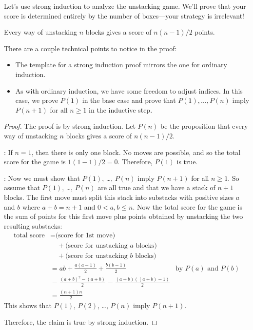 \iffalse
You will see in class how to use strong induction to analyze this game of
blocks.
\fi



Let's use strong induction to analyze the unstacking game.  We'll prove
that your score is determined entirely by the number of boxes---your
strategy is irrelevant!

\begin{theorem}\label{stacking}
Every way of unstacking $n$ blocks gives a score of $n(n-1)/2$ points.
\end{theorem}

There are a couple technical points to notice in the proof:

\begin{itemize}

\item The template for a strong induction proof mirrors the one for
  ordinary induction.

\item As with ordinary induction, we have some freedom to adjust indices.
In this case, we prove $P(1)$ in the base case and prove that $P(1),
\dots, P(n)$ imply $P(n+1)$ for all $n \geq 1$ in the inductive step.

\end{itemize}

\begin{proof}
The proof is by strong induction.  Let $P(n)$ be the proposition that
every way of unstacking $n$ blocks gives a score of $n(n-1)/2$.

: If $n = 1$, then there is only one
block.  No moves are possible, and so the total score for the game is
$1(1 - 1)/2 = 0$.  Therefore, $P(1)$ is true.

: Now we must show that $P(1)$, \dots, $P(n)$ imply
$P(n+1)$ for all $n \geq 1$.  So assume that $P(1)$, \dots, $P(n)$ are all
true and that we have a stack of $n+1$ blocks.  The first move must split
this stack into substacks with positive sizes $a$ and $b$ where $a+b =
n+1$ and $0<a,b\leq n$.  Now the total score for the game is the sum of
points for this first move plus points obtained by unstacking the two
resulting substacks:
%
\begin{align*}
\text{total score}
    & = \text{(score for 1st move)} \\
    & \quad + \text{(score for unstacking $a$ blocks)} \\
    & \quad + \text{(score for unstacking $b$ blocks)} \\
    & = ab + \frac{a(a-1)}{2} + \frac{b(b-1)}{2} & \text{by $P(a)$ and $P(b)$}\\
    & = \frac{(a+b)^2-(a+b)}{2} = \frac{(a+b)((a+b)-1)}{2}\\
    & = \frac{(n+1)n}{2}
\end{align*}
%
This shows that $P(1)$, $P(2)$, \dots, $P(n)$ imply $P(n+1)$.

Therefore, the claim is true by strong induction.
\end{proof}

